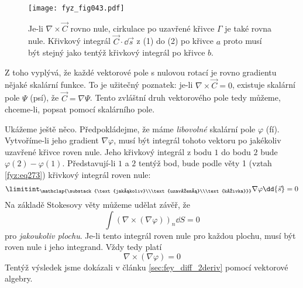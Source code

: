     \begin{figure}[ht!]  %
      \centering
      \texttt{[image: fyz\_fig043.pdf]}
      \caption{Je-li \(\nabla\times\vec{C}\) rovno nule, cirkulace po uzavřené křivce \(\Gamma\)   
        je také rovna nule. Křivkový integrál \(\vec{C}\cdot\dd{\vec{s}}\) z (1) do (2) po 
        křivce \(a\) proto musí být stejný jako tentýž křivkový integrál po křivce \(b\).}
      \label{fyz:fig043}
    \end{figure}
    Z toho vyplývá, že každé vektorové pole s nulovou rotací je rovno gradientu nějaké skalární 
    funkce. To je užitečný poznatek: je-li \(\nabla\times\vec{C}=0\), existuje skalární pole 
    \(\Psi\) (psí), že \(\vec{C}=\nabla\Psi\). Tento zvláštní druh vektorového pole tedy můžeme, 
    chceme-li, popsat pomocí skalárního pole.
    
    Ukážeme ještě něco. Předpokládejme, že máme \emph{libovolné} skalární pole \(\varphi\) (fí). 
    Vytvoříme-li jeho gradient \(\nabla\varphi\), musí být integrál tohoto vektoru po jakékoliv 
    uzavřené křivce  roven nule. Jeho křivkový integrál z bodu \(1\) do bodu \(2\) bude 
    \(\varphi(2) - \varphi(1)\). Představují-li \(1\) a \(2\) tentýž bod, bude podle věty 1 (vztah 
    \ref{fyz:eq273}) křivkový integrál roven nule:
    \begin{equation}\label{fyz:eq359}
      \limitint_{\mathclap{\substack{\text{jakákoliv}\\\text{uzavřená}\\\text{křivka}}}}
        \nabla\varphi\dd{\vec{s}} = 0
    \end{equation}
    Na základě Stokesovy věty můžeme udělat závěř, že 
    \begin{equation}\label{fyz:eq_fey_null0} 
      \int(\nabla\times(\nabla\varphi))_n\dd{S} = 0
    \end{equation} 
    pro \emph{jakoukoliv plochu}. Je-li tento integrál roven nule pro každou plochu, musí být 
    roven nule i jeho integrand. Vždy tedy platí
    \begin{equation}
      \nabla\times(\nabla\varphi) = 0
    \end{equation}
    Tentýž výsledek jsme dokázali v článku \ref{sec:fey_diff_2deriv} pomocí vektorové algebry.      
    
